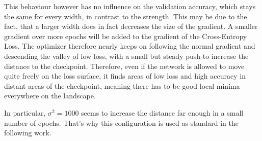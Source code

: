 This behaviour however has no influence on the validation accuracy, which stays
the same for every width, in contrast to the strength. This may be due to the
fact, that a larger width does in fact decreases the size of the gradient. A
smaller gradient over more epochs will be added to the gradient of the
Cross-Entropy Loss. The optimizer therefore nearly keeps on following the normal
gradient and descending the valley of low loss, with a small but steady push to
increase the distance to the checkpoint. Therefore, even if the network is
allowed to move quite freely on the loss surface, it finds areas of low loss and
high accuracy in distant areas of the checkpoint, meaning there has to be good
local minima everywhere on the landscape.

In particular, $\sigma^2 = 1000$ seems to increase the distance far enough in a
small number of epochs. That's why this configuration is used as standard in the
following work.
\pagebreak

